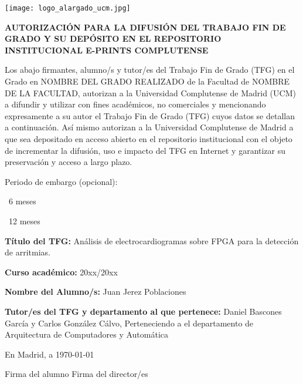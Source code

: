 {
	\newcommand{\checkbox}{{\fboxsep=-.15pt\fbox{\rule{0pt}{1.5ex}\rule{1.5ex}{0pt}}}}
	
	\setlength{\parskip}{14pt}

	\noindent\texttt{[image: logo\_alargado\_ucm.jpg]}
	\vspace{0.5cm}
	\begin{center}
		\textbf{AUTORIZACIÓN PARA LA DIFUSIÓN DEL TRABAJO FIN DE GRADO Y SU DEPÓSITO EN EL REPOSITORIO INSTITUCIONAL E-PRINTS COMPLUTENSE}
	\end{center}
	\vspace{0.5cm}

	\noindent Los abajo firmantes, alumno/s y tutor/es del Trabajo Fin de Grado (TFG) en el Grado en 
	NOMBRE DEL GRADO REALIZADO de la Facultad de NOMBRE DE LA FACULTAD, autorizan a la Universidad Complutense de Madrid (UCM) 
	a difundir y utilizar con fines académicos, no comerciales y mencionando expresamente 
	a su autor el Trabajo Fin de Grado (TFG) cuyos datos se detallan a continuación. 
	Así mismo autorizan a la Universidad Complutense de Madrid a que sea depositado en acceso abierto
	en el repositorio institucional con el objeto de incrementar la difusión, 
	uso e impacto del TFG en Internet y garantizar su preservación y acceso a largo plazo. 

	\noindent Periodo de embargo (opcional): 

	\quad \checkbox\ 6 meses 
	
	\quad \checkbox\ 12 meses 

	\vspace{0.5cm}

	\noindent \textbf{Título del TFG: }Análisis de electrocardiogramas sobre FPGA para la detección de arritmias.

	\noindent \textbf{Curso académico: } 20xx/20xx    
	
	\noindent \textbf{Nombre del Alumno/s: }Juan Jerez Poblaciones
	
	\noindent \textbf{Tutor/es del TFG y departamento al que pertenece: }Daniel Bascones García y Carlos González Cálvo, Perteneciendo a el departamento de Arquitectura de Computadores y Automática
	\vspace{1cm}

	\begin{center}
		En Madrid, a \today

		\vspace{1cm}

		Firma del alumno \hfill Firma del director/es
	\end{center}
}